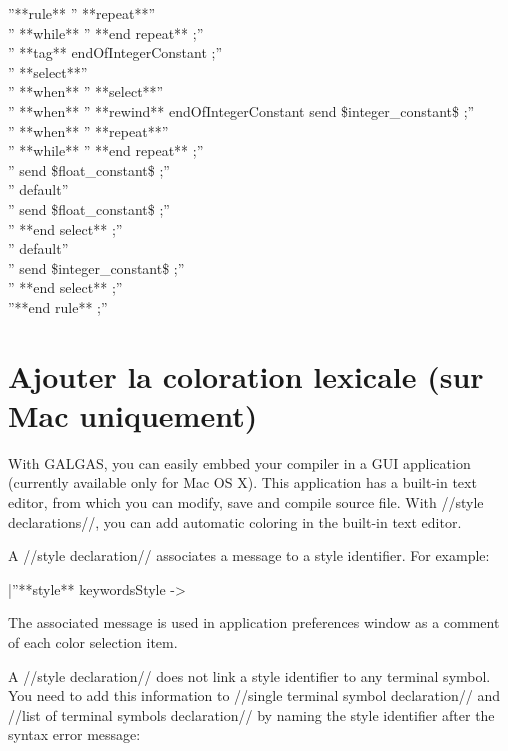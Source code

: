 ''**rule** %
'' **repeat**''\\
'' **while** %
'' **end repeat** ;''\\
'' **tag** endOfIntegerConstant ;''\\
'' **select**''\\
'' **when** %
''  **select**''\\
''  **when** %
''   **rewind** endOfIntegerConstant send \$integer\_constant\$ ;''\\
''  **when** %
''   **repeat**''\\
''   **while** %
''   **end repeat** ;''\\
''   send \$float\_constant\$ ;''\\
''  default''\\
''   send \$float\_constant\$ ;''\\
''  **end select** ;''\\
'' default''\\
''  send \$integer\_constant\$ ;''\\
'' **end select** ;''\\
''**end rule** ;''\\


\section{Ajouter la coloration lexicale (sur Mac uniquement)}

With GALGAS, you can easily embbed your compiler in a GUI application (currently available only for Mac OS X). This application has a built-in text editor, from which you can modify, save and compile source file. With //style declarations//, you can add automatic coloring in the built-in text editor.

A //style declaration// associates a message to a style identifier. For example:

|''**style** keywordsStyle -> %

The associated message is used in application preferences window as a comment of each color selection item.

A //style declaration// does not link a style identifier to any terminal symbol. You need to add this information to //single terminal symbol declaration// and //list of terminal symbols declaration// by naming the style identifier after the syntax error message:

